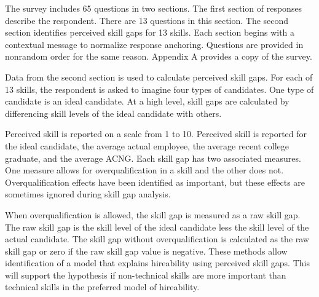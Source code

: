 \documentclass[review]{elsarticle}
\begin{document}
The survey includes 65 questions in two sections.
The first section of responses describe the respondent.
There are 13 questions in this section.
The second section identifies perceived skill gaps for 13 skills.
Each section begins with a contextual message to normalize response anchoring.
Questions are provided in nonrandom order for the same reason.
Appendix A provides a copy of the survey.


Data from the second section is used to calculate perceived skill gaps.
For each of 13 skills, the respondent is asked to imagine four types of candidates.
One type of candidate is an ideal candidate.
At a high level, skill gaps are calculated by differencing skill levels of the ideal candidate with others.

Perceived skill is reported on a scale from 1 to 10.
Perceived skill is reported for the ideal candidate,
the average actual employee,
the average recent college graduate,
and the average ACNG.
Each skill gap has two associated measures.
One measure allows for overqualification in a skill and the other does not.
Overqualification effects have been identified as important\cite{green2007there, raybould2005over}, but these effects are sometimes ignored during skill gap analysis\cite{blake_2018}.

When overqualification is allowed, the skill gap is measured as a raw skill gap.
The raw skill gap is the skill level of the ideal candidate less the skill level of the actual candidate.
The skill gap without overqualification is calculated as the raw skill gap or zero if the raw skill gap value is negative.
These methods allow identification of a model that explains hireability using perceived skill gaps.
This will support the hypothesis if non-technical skills are more important than technical skills in the preferred model of hireability.
\end{document}

